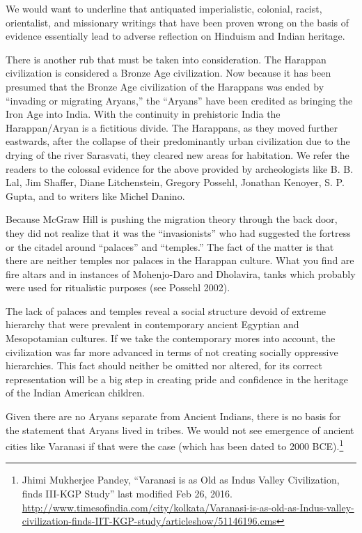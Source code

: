 We would want to underline that antiquated imperialistic, colonial, racist, orientalist, and missionary writings that have been proven wrong on the basis of evidence essentially lead to adverse reflection on Hinduism and Indian heritage. 

There is another rub that must be taken into consideration. The Harappan civilization is considered a Bronze Age civilization. Now because it has been presumed that the Bronze Age civilization of the Harappans was ended by “invading or migrating Aryans,” the “Aryans” have been credited as bringing the Iron Age into India. With the continuity in prehistoric India the Harappan/Aryan is a fictitious divide. The Harappans, as they moved further eastwards, after the collapse of their predominantly urban civilization due to the drying of the river Sarasvati, they cleared new areas for habitation. We refer the readers to the colossal evidence for the above provided by archeologists like B. B. Lal, Jim Shaffer, Diane Litchenstein, Gregory Possehl, Jonathan Kenoyer, S. P. Gupta, and to writers like Michel Danino. 

Because McGraw Hill is pushing the migration theory through the back door, they did not realize that it was the “invasionists” who had suggested the fortress or the citadel around “palaces” and “temples.” The fact of the matter is that there are neither temples nor palaces in the Harappan culture. What you find are fire altars and in instances of Mohenjo-Daro and Dholavira, tanks which probably were used for ritualistic purposes (see Possehl 2002). 

The lack of palaces and temples reveal a social structure devoid of extreme hierarchy that were prevalent in contemporary ancient Egyptian and Mesopotamian cultures. If we take the contemporary mores into account, the civilization was far more advanced in terms of not creating socially oppressive hierarchies. This fact should neither be omitted nor altered, for its correct representation will be a big step in creating pride and confidence in the heritage of the Indian American children. 

Given there are no Aryans separate from Ancient Indians, there is no basis for the statement that Aryans lived in tribes. We would not see emergence of ancient cities like Varanasi if that were the case (which has been dated to 2000 BCE).\footnote{Jhimi Mukherjee Pandey, “Varanasi is as Old as Indus Valley 	Civilization, finds III-KGP Study” last modified Feb 26, 2016. 	\url{http://www.timesofindia.com/city/kolkata/Varanasi-is-as-old-as-Indus-valley-civilization-finds-IIT-KGP-study/articleshow/51146196.cms}} 

